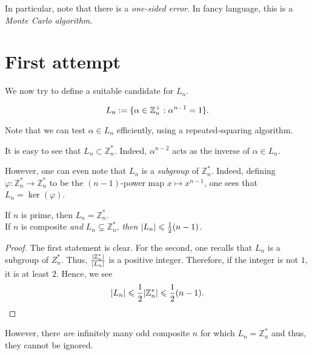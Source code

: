\documentclass[12pt]{article}
\begin{document}
     In particular, note that there is a \emph{one-sided error}.  In fancy language, this is a \emph{Monte Carlo algorithm}.


\section{First attempt}

    We now try to define a suitable candidate for $L_{n}$.  
    \begin{defn}
        \begin{equation} \label{eq:green}
            L_{n} \vcentcolon= \{\alpha \in \mathbb{Z}_{n}^{+} : \alpha^{n - 1} = 1\}. 
        \end{equation}
    \end{defn}
     
    Note that we can test $\alpha \in L_{n}$ efficiently, using a repeated-squaring algorithm.

    \begin{obs}
        It is easy to see that $L_{n} \subset \mathbb{Z}_{n}^{\ast}$. Indeed, $\alpha^{n - 2}$ acts as the inverse of $\alpha \in L_{n}$. 

        However, one can even note that $L_{n}$ is a \emph{subgroup} of $\mathbb{Z}_{n}^{\ast}$. Indeed, defining $\varphi : \mathbb{Z}_{n}^{\ast} \to \mathbb{Z}_{n}^{\ast}$ to be the $(n - 1)$-power map $x \mapsto x^{n - 1}$, one sees that $L_{n} = \ker(\varphi)$.
    \end{obs}

    \begin{thm}
        If $n$ is prime, then $L_{n} = \mathbb{Z}_{n}^{\ast}$. \\
        If $n$ is composite \emph{and} $L_{n} \subsetneq \mathbb{Z}_{n}^{\ast}$, \emph{then} ${\left\lvert L_{n} \right\lvert} \leqslant \frac{1}{2}(n - 1)$.
    \end{thm}
     
    \begin{proof}
        The first statement is clear. For the second, one recalls that $L_{n}$ is a subgroup of $Z_{n}^{\ast}$. Thus, $\frac{{\left\lvert \mathbb{Z}_{n}^{\ast} \right\lvert}}{{\left\lvert L_{n} \right\lvert}}$ is a positive integer. Therefore, if the integer is not $1$, it is at least $2$. Hence, we see
        \begin{equation*} 
            {\left\lvert L_{n} \right\lvert} \leqslant \frac{1}{2}{\left\lvert \mathbb{Z}_{n}^{\ast} \right\lvert} \leqslant \frac{1}{2}(n - 1). \qedhere
        \end{equation*}
    \end{proof}
     However, there \emph{are} infinitely many odd composite $n$ for which $L_{n} = \mathbb{Z}_{n}^{\ast}$  and thus, they cannot be ignored.
\end{document}
